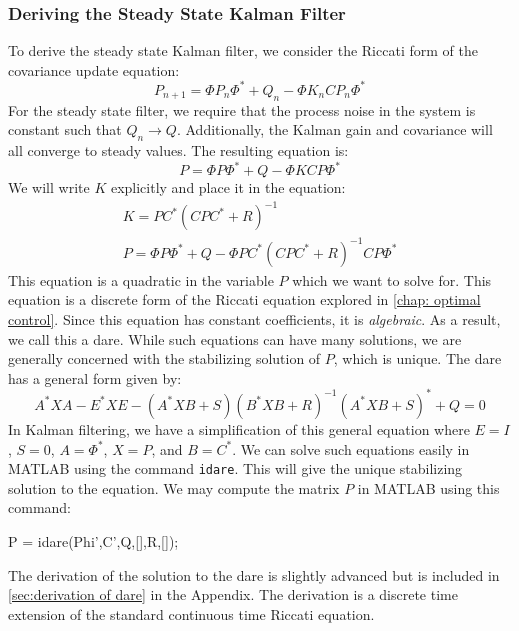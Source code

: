 \subsubsection{Deriving the Steady State Kalman Filter}
To derive the steady state Kalman filter, we consider the Riccati form of the covariance update equation:
$$P_{n+1}=\Phi P_n\Phi^*+Q_n-\Phi K_nCP_n\Phi^*$$
For the steady state filter, we require that the process noise in the system is constant such that $Q_n\rightarrow Q$. Additionally, the Kalman gain and covariance will all converge to steady values. The resulting equation is:
$$P=\Phi P\Phi^*+Q-\Phi KCP\Phi^*$$
We will write $K$ explicitly and place it in the equation:
\begin{gather}
K=PC^*(CPC^*+R)^{-1}\\
P=\Phi P\Phi^*+Q-\Phi PC^*(CPC^*+R)^{-1}CP\Phi^*
\end{gather}
This equation is a quadratic in the variable $P$ which we want to solve for. This equation is a discrete form of the Riccati equation explored in \autoref{chap: optimal control}. Since this equation has constant coefficients, it is \textit{algebraic}. As a result, we call this a \gls{dare}. While such equations can have many solutions, we are generally concerned with the stabilizing solution of $P$, which is unique. The \gls{dare} has a general form given by:
$$A^*XA-E^*XE-(A^*XB+S)(B^*XB+R)^{-1}(A^*XB+S)^*+Q=0$$
In Kalman filtering, we have a simplification of this general equation where $E=I$, $S=0$, $A=\Phi^*$, $X=P$, and $B=C^*$. We can solve such equations easily in MATLAB using the command \texttt{idare}. This will give the unique stabilizing solution to the equation. We may compute the matrix $P$ in MATLAB using this command:
\begin{matlabscript}{}
P = idare(Phi',C',Q,[],R,[]);
\end{matlabscript}
The derivation of the solution to the \gls{dare} is slightly advanced but is included in \autoref{sec:derivation of dare} in the Appendix. The derivation is a discrete time extension of the standard continuous time Riccati equation.

